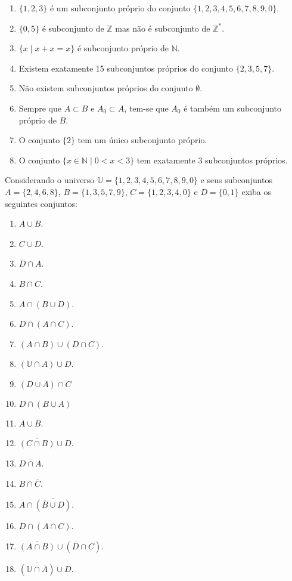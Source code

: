 \begin{problemset}
\begin{enumerate}
		\item $\{1, 2, 3\}$ é um subconjunto próprio do conjunto $\{1, 2, 3, 4, 5, 6, 7,8,9,0\}$.
		\item $\{0, 5\}$ é subconjunto de $\mathbb{Z}$ mas não é subconjunto de $\mathbb{Z}^*$.
		\item $\{ x \mid x + x = x\}$ é subconjunto próprio de $\mathbb{N}$.
		\item Existem exatamente 15 subconjuntos próprios do conjunto $\{2, 3, 5, 7\}$.
		\item Não existem subconjuntos próprios do conjunto $\emptyset$.
		\item Sempre que $A \subset B$ e $A_0 \subset A$, tem-se que $A_0$ é também um subconjunto próprio de $B$.
		\item O conjunto $\{2\}$ tem um único subconjunto próprio.
		\item O conjunto $\{x \in \mathbb{N} \mid 0 < x < 3\}$ tem exatamente 3 subconjuntos próprios.
	\end{enumerate}
	\item Considerando o universo $\mathbb{U} = \{1, 2, 3, 4, 5, 6, 7, 8, 9, 0\}$ e seus subconjuntos $A = \{2, 4, 6, 8\}$, $B = \{1, 3, 5, 7, 9\}$, $C = \{1, 2, 3, 4, 0\}$ e $D = \{0, 1\}$ exiba os seguintes conjuntos:
	\begin{enumerate}
		\item $A \cup B$.
		\item $C \cup D$.
		\item $D \cap A$.
		\item $B \cap C$.
		\item $A \cap (B \cup D)$.
		\item $D \cap (A \cap C)$.
		\item $(A \cap B) \cup (D \cap C)$.
		\item $(\mathbb{U} \cap A) \cup D$.
		\item $(D \cup A) \cap C$
		\item $D \cap (B \cup A)$
		\item $A \cup \overline{B}$.
		\item $\overline{(C \cap B)} \cup D$.
		\item $\overline{D \cap A}$.
		\item $B \cap \overline{C}$.
		\item $A \cap \overline{(\overline{B} \cup D)}$.
		\item $D \cap (A \cap C)$.
		\item $\overline{(A \cap B)} \cup (\overline{D} \cap C)$.
		\item $\overline{(\mathbb{U} \cap \overline{A})} \cup D$.

\end{enumerate}
\end{problemset}
